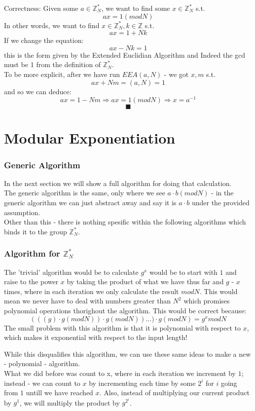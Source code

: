 \documentclass{article}
\begin{document}
Correctness:
Given some $a\in \mathbb{Z}^*_N$, we want to find some $x\in\mathbb{Z}^*_N$ s.t.
\[ax=1(mod N)\]
In other words, we want to find $x\in \mathbb{Z}^*_N, k\in\mathbb{Z}$ s.t.
\[ax=1+Nk\]
If we change the equation:
\[ax-Nk=1\]
this is the form given by the Extended Euclidian Algorithm and Indeed the gcd must be 1 from the definition of
$\mathbb{Z}^*_N$.\\

To be more explicit, after we have run $EEA(a,N)$ - we got $x,m$ s.t.
\[ax+Nm=(a,N)=1\]
and so we can deduce:
\[
	ax=1-Nm
	\Rightarrow ax=1(mod N)
	\Rightarrow x = a^{-1}
\]
\[\blacksquare\]

\part*{Modular Exponentiation}
\setcounter{section}{0}
\section{Generic Algorithm}
In the next section we will show a full algorithm for doing that calculation.\\
The generic algorithm is the same, only where we see $a\cdot b(mod N)$ - in the generic algorithm
we can just abstract away and say it is $a\cdot b$ under the provided assumption.\\
Other than this - there is nothing spesific within the following algorithms which binds it
to the group $\mathbb{Z}_N^*$.

\section{Algorithm for $\mathbb{Z}_N^*$}
The 'trivial' algorithm would be to calculate $g^x$ would be to start 
with $1$ and raise to the power $x$ by taking the product of what we have thus far
and $g$ - $x$ times, where in each iteration we only calculate the result $mod N$.
This would mean we never have to deal with numbers greater than $N^2$ which 
promises polynomial operations thorighout the algorithm.
This would be correct because:
\[
	(((g)\cdot g(mod N))\cdot g(mod N))...)\cdot g(mod N) = g^x mod N
\]
The small problem with this algorithm is that it is polynomial with respect
to $x$, which makes it exponential with respect to the input length!

While this disqualifies this algorithm, we can use these same ideas to make a new - 
polynomial - algorithm.\\
What we did before was count to x, where in each iteration we increment by $1$; instead -
we can count to $x$ by incrementing each time by some $2^i$ for $i$ going from $1$ untill
we have reached $x$.
Also, instead of multiplying our current product by $g^1$,
we will multiply the product by $g^{2^i}$.\\
\end{document}
